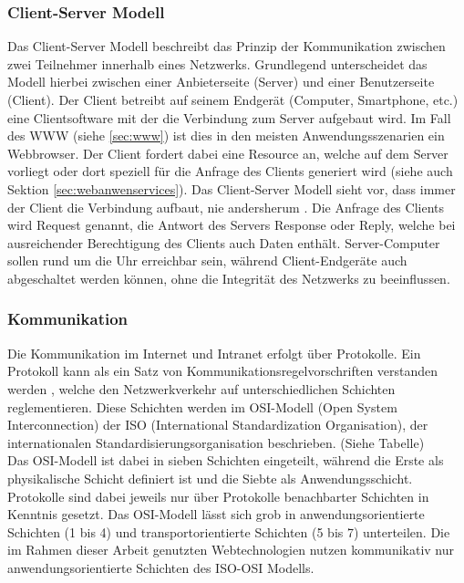  \subsubsection{Client-Server Modell}\label{sec:clientservermodell}
 Das Client-Server Modell beschreibt das Prinzip der Kommunikation zwischen zwei Teilnehmer innerhalb eines Netzwerks. Grundlegend unterscheidet das Modell hierbei zwischen einer Anbieterseite (Server) und einer Benutzerseite (Client). Der Client betreibt auf seinem Endgerät (Computer, Smartphone, etc.) eine Clientsoftware mit der die Verbindung zum Server aufgebaut wird. Im Fall des WWW (siehe \ref{sec:www}) ist dies in den meisten Anwendungsszenarien ein Webbrowser. Der Client fordert dabei eine Resource an, welche auf dem Server vorliegt oder dort speziell für die Anfrage des Clients generiert wird (siehe auch Sektion \ref{sec:webanwenservices}). Das Client-Server Modell sieht vor, dass immer der Client die Verbindung aufbaut, nie andersherum \cite{ElektronikKompendium.de:online}. Die Anfrage des Clients wird Request genannt, die Antwort des Servers Response oder Reply, welche bei ausreichender Berechtigung des Clients auch Daten enthält. 
 Server-Computer sollen rund um die Uhr erreichbar sein, während Client-Endgeräte auch abgeschaltet werden können, ohne die Integrität des Netzwerks zu beeinflussen. 
 
\subsubsection{Kommunikation}\label{sec:kommunikation}
Die Kommunikation im Internet und Intranet erfolgt über Protokolle. 
Ein Protokoll kann als ein Satz von Kommunikationsregelvorschriften verstanden werden \cite{safran2011webtechnologien:article}, welche den Netzwerkverkehr auf unterschiedlichen Schichten reglementieren. 
Diese Schichten werden im OSI-Modell (Open System Interconnection) der ISO (International Standardization Organisation), der internationalen Standardisierungsorganisation beschrieben. (Siehe Tabelle) %
\\ 
Das OSI-Modell ist dabei in sieben Schichten eingeteilt, während die Erste als physikalische Schicht definiert ist und die Siebte als Anwendungsschicht. Protokolle sind dabei jeweils nur über Protokolle benachbarter Schichten in Kenntnis gesetzt. Das OSI-Modell lässt sich grob in anwendungsorientierte Schichten (1 bis 4) und transportorientierte Schichten (5 bis 7) unterteilen. Die im Rahmen dieser Arbeit genutzten Webtechnologien nutzen kommunikativ nur anwendungsorientierte Schichten des ISO-OSI Modells.



